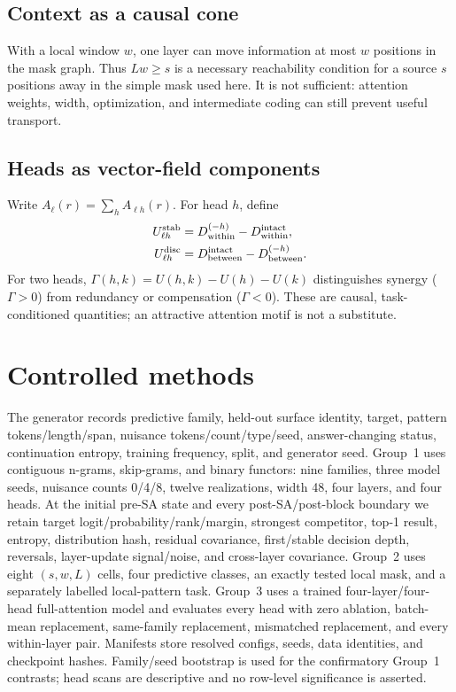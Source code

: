 \documentclass[10pt]{article}
\begin{document}
\subsection{Context as a causal cone}
With a local window $w$, one layer can move information at most $w$ positions in the mask graph.  Thus $Lw\ge s$ is a necessary reachability condition for a source $s$ positions away in the simple mask used here.  It is not sufficient: attention weights, width, optimization, and intermediate coding can still prevent useful transport.

\subsection{Heads as vector-field components}
Write $A_\ell(r)=\sum_h A_{\ell h}(r)$.  For head $h$, define
\begin{align}U^{\rm stab}_{\ell h}&=D^{(-h)}_{\rm within}-D^{\rm intact}_{\rm within},\\
U^{\rm disc}_{\ell h}&=D^{\rm intact}_{\rm between}-D^{(-h)}_{\rm between}.
\end{align}
For two heads, $\Gamma(h,k)=U(h,k)-U(h)-U(k)$ distinguishes synergy ($\Gamma>0$) from redundancy or compensation ($\Gamma<0$).  These are causal, task-conditioned quantities; an attractive attention motif is not a substitute.

\section{Controlled methods}
The generator records predictive family, held-out surface identity, target, pattern tokens/length/span, nuisance tokens/count/type/seed, answer-changing status, continuation entropy, training frequency, split, and generator seed.  Group~1 uses contiguous n-grams, skip-grams, and binary functors: nine families, three model seeds, nuisance counts 0/4/8, twelve realizations, width 48, four layers, and four heads. At the initial pre-SA state and every post-SA/post-block boundary we retain target logit/probability/rank/margin, strongest competitor, top-1 result, entropy, distribution hash, residual covariance, first/stable decision depth, reversals, layer-update signal/noise, and cross-layer covariance. Group~2 uses eight $(s,w,L)$ cells, four predictive classes, an exactly tested local mask, and a separately labelled local-pattern task.  Group~3 uses a trained four-layer/four-head full-attention model and evaluates every head with zero ablation, batch-mean replacement, same-family replacement, mismatched replacement, and every within-layer pair.  Manifests store resolved configs, seeds, data identities, and checkpoint hashes.  Family/seed bootstrap is used for the confirmatory Group~1 contrasts; head scans are descriptive and no row-level significance is asserted.
\end{document}
